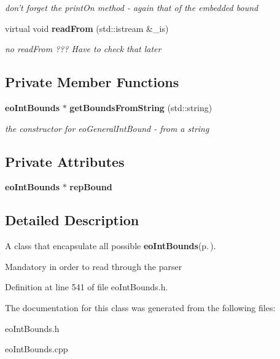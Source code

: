 \begin{CompactItemize}
\begin{CompactList}\small\item\em don't forget the print\-On method - again that of the embedded bound \item\end{CompactList}\item 
virtual void {\bf read\-From} (std::istream \&\_\-is)\label{classeo_general_int_bounds_a19}

\begin{CompactList}\small\item\em no read\-From ??? Have to check that later \item\end{CompactList}\end{CompactItemize}
\subsection*{Private Member Functions}
\begin{CompactItemize}
\item 
{\bf eo\-Int\-Bounds} $\ast$ {\bf get\-Bounds\-From\-String} (std::string)\label{classeo_general_int_bounds_d0}

\begin{CompactList}\small\item\em the constructor for eo\-General\-Int\-Bound - from a string \item\end{CompactList}\end{CompactItemize}
\subsection*{Private Attributes}
\begin{CompactItemize}
\item 
{\bf eo\-Int\-Bounds} $\ast$ {\bf rep\-Bound}\label{classeo_general_int_bounds_r0}

\end{CompactItemize}


\subsection{Detailed Description}
A class that encapsulate all possible {\bf eo\-Int\-Bounds}{\rm (p.\,\pageref{classeo_int_bounds})}. 

Mandatory in order to read through the parser 



Definition at line 541 of file eo\-Int\-Bounds.h.

The documentation for this class was generated from the following files:\begin{CompactItemize}
\item 
eo\-Int\-Bounds.h\item 
eo\-Int\-Bounds.cpp\end{CompactItemize}
